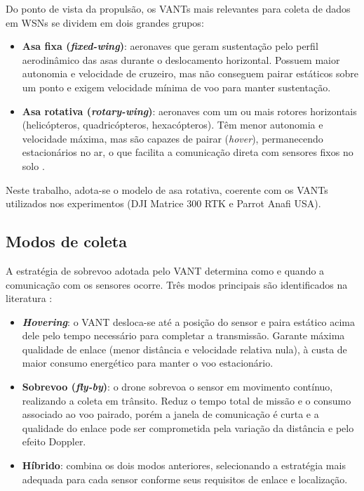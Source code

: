 Do ponto de vista da propulsão, os VANTs mais relevantes para coleta de dados em WSNs se dividem em dois grandes grupos:

\begin{itemize}
    \item \textbf{Asa fixa (\textit{fixed-wing})}: aeronaves que geram sustentação pelo perfil aerodinâmico das asas durante o deslocamento horizontal. Possuem maior autonomia e velocidade de cruzeiro, mas não conseguem pairar estáticos sobre um ponto e exigem velocidade mínima de voo para manter sustentação.
    \item \textbf{Asa rotativa (\textit{rotary-wing})}: aeronaves com um ou mais rotores horizontais (helicópteros, quadricópteros, hexacópteros). Têm menor autonomia e velocidade máxima, mas são capazes de pairar (\emph{hover}), permanecendo estacionários no ar, o que facilita a comunicação direta com sensores fixos no solo \cite{zeng2019rotarywing}.
\end{itemize}

Neste trabalho, adota-se o modelo de asa rotativa, coerente com os VANTs utilizados nos experimentos (DJI Matrice 300 RTK e Parrot Anafi USA).

\subsection{Modos de coleta}
\label{sec:modos-coleta}

A estratégia de sobrevoo adotada pelo VANT determina como e quando a comunicação com os sensores ocorre. Três modos principais são identificados na literatura \cite{messaoudi2023survey,wei2022survey}:

\begin{itemize}
    \item \textbf{\textit{Hovering}}: o VANT desloca-se até a posição do sensor e paira estático acima dele pelo tempo necessário para completar a transmissão. Garante máxima qualidade de enlace (menor distância e velocidade relativa nula), à custa de maior consumo energético para manter o voo estacionário.
    \item \textbf{Sobrevoo (\textit{fly-by})}: o drone sobrevoa o sensor em movimento contínuo, realizando a coleta em trânsito. Reduz o tempo total de missão e o consumo associado ao voo pairado, porém a janela de comunicação é curta e a qualidade do enlace pode ser comprometida pela variação da distância e pelo efeito Doppler.
    \item \textbf{Híbrido}: combina os dois modos anteriores, selecionando a estratégia mais adequada para cada sensor conforme seus requisitos de enlace e localização.
\end{itemize}

